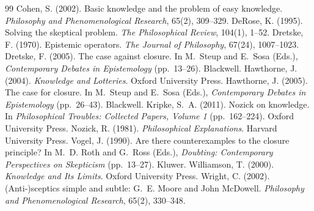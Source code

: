 \documentclass{situationist-preprint}
\begin{document}
\begin{thebibliography}{99}\small
{} Cohen, S. (2002). Basic knowledge and the problem of easy knowledge. \emph{Philosophy and Phenomenological Research}, 65(2), 309--329.
 DeRose, K. (1995). Solving the skeptical problem. \emph{The Philosophical Review}, 104(1), 1--52.
 Dretske, F. (1970). Epistemic operators. \emph{The Journal of Philosophy}, 67(24), 1007--1023.
 Dretske, F. (2005). The case against closure. In M.~Steup and E.~Sosa (Eds.), \emph{Contemporary Debates in Epistemology} (pp.~13--26). Blackwell.
 Hawthorne, J. (2004). \emph{Knowledge and Lotteries}. Oxford University Press.
 Hawthorne, J. (2005). The case for closure. In M.~Steup and E.~Sosa (Eds.), \emph{Contemporary Debates in Epistemology} (pp.~26--43). Blackwell.
 Kripke, S.~A. (2011). Nozick on knowledge. In \emph{Philosophical Troubles: Collected Papers, Volume 1} (pp.~162--224). Oxford University Press.
 Nozick, R. (1981). \emph{Philosophical Explanations}. Harvard University Press.
 Vogel, J. (1990). Are there counterexamples to the closure principle? In M.~D. Roth and G.~Ross (Eds.), \emph{Doubting: Contemporary Perspectives on Skepticism} (pp.~13--27). Kluwer.
 Williamson, T. (2000). \emph{Knowledge and Its Limits}. Oxford University Press.
 Wright, C. (2002). (Anti-)sceptics simple and subtle: G.~E. Moore and John McDowell. \emph{Philosophy and Phenomenological Research}, 65(2), 330--348.
\end{thebibliography}
\end{document}
